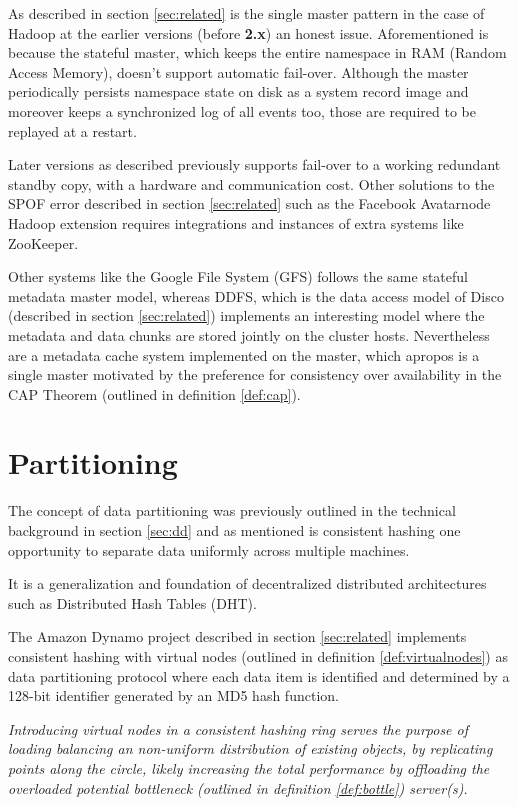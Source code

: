 As described in section \ref{sec:related} is the single master pattern in the case of Hadoop at the earlier versions (before \textbf{2.x}) an honest issue. Aforementioned is because the stateful master, which keeps the entire namespace in RAM (Random Access Memory), doesn't support automatic fail-over. Although the master periodically persists namespace state on disk as a system record image and moreover keeps a synchronized log of all events too, those are required to be replayed at a restart.

Later versions as described previously supports fail-over to a working redundant standby copy, with a hardware and communication cost. Other solutions to the SPOF error described in section \ref{sec:related} such as the Facebook Avatarnode Hadoop extension requires integrations and instances of extra systems like ZooKeeper.
\newline

Other systems like the Google File System (GFS) follows the same stateful metadata master model, whereas DDFS, which is the data access model of Disco (described in section \ref{sec:related}) implements an interesting model where the metadata and data chunks are stored jointly on the cluster hosts. Nevertheless are a metadata cache system implemented on the master, which apropos is a single master motivated by the preference for consistency over availability in the CAP Theorem (outlined in definition \ref{def:cap}).

\section{Partitioning} \label{sec:partitioning}
The concept of data partitioning was previously outlined in the technical background in section \ref{sec:dd} and as mentioned is consistent hashing one opportunity to separate data uniformly across multiple machines. 

It is a generalization and foundation of decentralized distributed architectures such as Distributed Hash Tables (DHT). 
\newline

The Amazon Dynamo project described in section \ref{sec:related} implements consistent hashing with virtual nodes (outlined in definition \ref{def:virtualnodes}) as data partitioning protocol where each data item is identified and determined by a 128-bit identifier generated by an MD5 hash function.
\vspace*{3mm}

\begin{definition} \label{def:virtualnodes}
\textit{Introducing virtual nodes in a consistent hashing ring serves the purpose of loading balancing an non-uniform distribution of existing objects, by replicating points along the circle, likely increasing the total performance by offloading the overloaded potential bottleneck (outlined in definition \ref{def:bottle}) server(s).}
\end{definition}
\vspace*{3mm}

